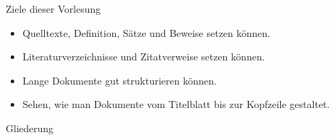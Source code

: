 
\begin{frame}{Ziele dieser Vorlesung}
  \begin{itemize}
    \item Quelltexte, Definition, Sätze und Beweise setzen können.
    \item Literaturverzeichnisse und Zitatverweise setzen können.
    \item Lange Dokumente gut strukturieren können.
    \item Sehen, wie man Dokumente vom Titelblatt bis zur Kopfzeile gestaltet.
  \end{itemize}
\end{frame}

\begin{frame}{Gliederung}
  \tableofcontents
\end{frame}

